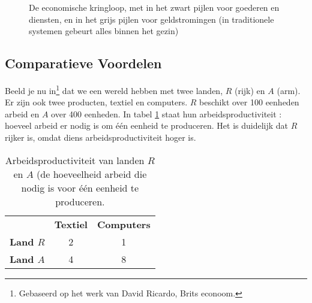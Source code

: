 \begin{figure}[H]
\small\centering\captionsetup{justification=centering,margin=2cm}
\caption{De economische kringloop, met in het zwart pijlen voor goederen en diensten, en in het grijs pijlen voor geldstromingen (in traditionele systemen gebeurt alles binnen het gezin)}
\label{fig:h1kringloop}
\end{figure}

\subsection{Comparatieve Voordelen}\label{sec:h1comp}

Beeld je nu in\footnote{Gebaseerd op het werk van David Ricardo, Brits econoom.} dat we een wereld hebben met twee landen, $R$ (rijk) en $A$ (arm). Er zijn ook twee producten, textiel en computers. $R$ beschikt over 100 eenheden arbeid en $A$ over 400 eenheden. In tabel \ref{tab:h1voordeel} staat hun arbeidsproductiviteit : hoeveel arbeid er nodig is om \'e\'en eenheid te produceren. Het is duidelijk dat $R$ rijker is, omdat diens arbeidsproductiviteit hoger is.

\begin{table}[H]
\small\centering\captionsetup{justification=centering,margin=2cm}
\begin{tabular}{l | c | c}
 & \textbf{Textiel} & \textbf{Computers} \\
\textbf{Land $R$} & 2 & 1\\
\textbf{Land $A$} & 4 & 8 \\
\end{tabular}
\caption{Arbeidsproductiviteit van landen $R$ en $A$ (de hoeveelheid arbeid die nodig is voor \'e\'en eenheid te produceren.}
\label{tab:h1voordeel}
\end{table}

